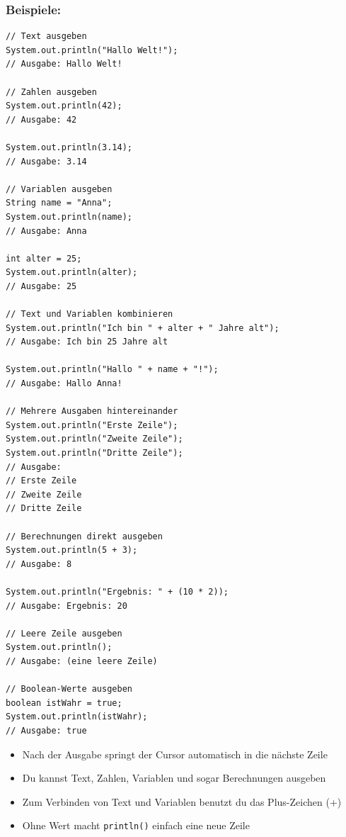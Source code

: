 \subsubsection*{Beispiele:}
\begin{lstlisting}
// Text ausgeben
System.out.println("Hallo Welt!");
// Ausgabe: Hallo Welt!

// Zahlen ausgeben
System.out.println(42);
// Ausgabe: 42

System.out.println(3.14);
// Ausgabe: 3.14

// Variablen ausgeben
String name = "Anna";
System.out.println(name);
// Ausgabe: Anna

int alter = 25;
System.out.println(alter);
// Ausgabe: 25

// Text und Variablen kombinieren
System.out.println("Ich bin " + alter + " Jahre alt");
// Ausgabe: Ich bin 25 Jahre alt

System.out.println("Hallo " + name + "!");
// Ausgabe: Hallo Anna!

// Mehrere Ausgaben hintereinander
System.out.println("Erste Zeile");
System.out.println("Zweite Zeile");
System.out.println("Dritte Zeile");
// Ausgabe:
// Erste Zeile
// Zweite Zeile
// Dritte Zeile

// Berechnungen direkt ausgeben
System.out.println(5 + 3);
// Ausgabe: 8

System.out.println("Ergebnis: " + (10 * 2));
// Ausgabe: Ergebnis: 20

// Leere Zeile ausgeben
System.out.println();
// Ausgabe: (eine leere Zeile)

// Boolean-Werte ausgeben
boolean istWahr = true;
System.out.println(istWahr);
// Ausgabe: true
\end{lstlisting}

\begin{achtung}
	\begin{itemize}
		\item Nach der Ausgabe springt der Cursor automatisch in die nächste Zeile
		\item Du kannst Text, Zahlen, Variablen und sogar Berechnungen ausgeben
		\item Zum Verbinden von Text und Variablen benutzt du das Plus-Zeichen (+)
		\item Ohne Wert macht \texttt{println()} einfach eine neue Zeile
	\end{itemize}
\end{achtung}

\newpage


